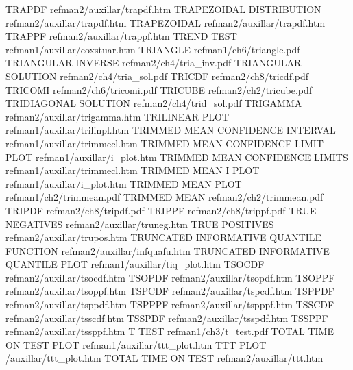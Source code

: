 TRAPDF                                  refman2/auxillar/trapdf.htm
TRAPEZOIDAL DISTRIBUTION                refman2/auxillar/trapdf.htm
TRAPEZOIDAL                             refman2/auxillar/trapdf.htm
TRAPPF                                  refman2/auxillar/trappf.htm
TREND TEST                              refman1/auxillar/coxstuar.htm
TRIANGLE                                refman1/ch6/triangle.pdf
TRIANGULAR INVERSE                      refman2/ch4/tria_inv.pdf
TRIANGULAR SOLUTION                     refman2/ch4/tria_sol.pdf
TRICDF                                  refman2/ch8/tricdf.pdf
TRICOMI                                 refman2/ch6/tricomi.pdf
TRICUBE                                 refman2/ch2/tricube.pdf
TRIDIAGONAL SOLUTION                    refman2/ch4/trid_sol.pdf
TRIGAMMA                                refman2/auxillar/trigamma.htm
TRILINEAR PLOT                          refman1/auxillar/trilinpl.htm
TRIMMED MEAN CONFIDENCE INTERVAL        refman1/auxillar/trimmecl.htm
TRIMMED MEAN CONFIDENCE LIMIT PLOT      refman1/auxillar/i_plot.htm
TRIMMED MEAN CONFIDENCE LIMITS          refman1/auxillar/trimmecl.htm
TRIMMED MEAN I PLOT                     refman1/auxillar/i_plot.htm
TRIMMED MEAN PLOT                       refman1/ch2/trimmean.pdf
TRIMMED MEAN                            refman2/ch2/trimmean.pdf
TRIPDF                                  refman2/ch8/tripdf.pdf
TRIPPF                                  refman2/ch8/trippf.pdf
TRUE NEGATIVES                          refman2/auxillar/truneg.htm
TRUE POSITIVES                          refman2/auxillar/trupos.htm
TRUNCATED INFORMATIVE QUANTILE FUNCTION refman2/auxillar/infquafu.htm
TRUNCATED INFORMATIVE QUANTILE PLOT     refman1/auxillar/tiq_plot.htm
TSOCDF                                  refman2/auxillar/tsocdf.htm
TSOPDF                                  refman2/auxillar/tsopdf.htm
TSOPPF                                  refman2/auxillar/tsoppf.htm
TSPCDF                                  refman2/auxillar/tspcdf.htm
TSPPDF                                  refman2/auxillar/tsppdf.htm
TSPPPF                                  refman2/auxillar/tspppf.htm
TSSCDF                                  refman2/auxillar/tsscdf.htm
TSSPDF                                  refman2/auxillar/tsspdf.htm
TSSPPF                                  refman2/auxillar/tssppf.htm
T TEST                                  refman1/ch3/t_test.pdf
TOTAL TIME ON TEST PLOT                 refman1/auxillar/ttt_plot.htm
TTT PLOT                                /auxillar/ttt_plot.htm
TOTAL TIME ON TEST                      refman2/auxillar/ttt.htm
